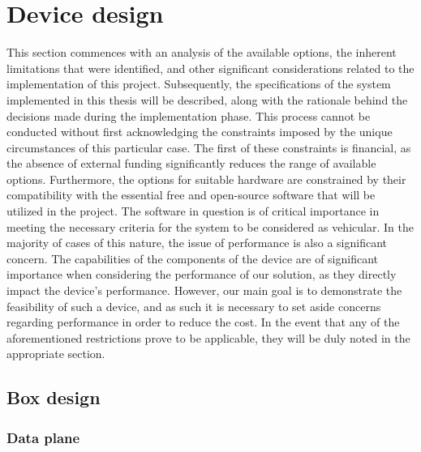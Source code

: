 \chapter{Device design}
\label{cha:device_design}


This section commences with an analysis of the available options, the inherent limitations that were identified, and other significant considerations related to the implementation of this project. Subsequently, the specifications of the system implemented in this thesis will be described, along with the rationale behind the decisions made during the implementation phase.
This process cannot be conducted without first acknowledging the constraints imposed by the unique circumstances of this particular case. The first of these constraints is financial, as the absence of external funding significantly reduces the range of available options. Furthermore, the options for suitable hardware are constrained by their compatibility with the essential free and open-source software that will be utilized in the project. The software in question is of critical importance in meeting the necessary criteria for the system to be considered as vehicular.
In the majority of cases of this nature, the issue of performance is also a significant concern. The capabilities of the components of the device are of significant importance when considering the performance of our solution, as they directly impact the device’s performance. However, our main goal is to demonstrate the feasibility of such a device, and as such it is necessary to set aside concerns regarding performance in order to reduce the cost.
In the event that any of the aforementioned restrictions prove to be applicable, they will be duly noted in the appropriate section.
\section{Box design}

\subsection{Data plane}


